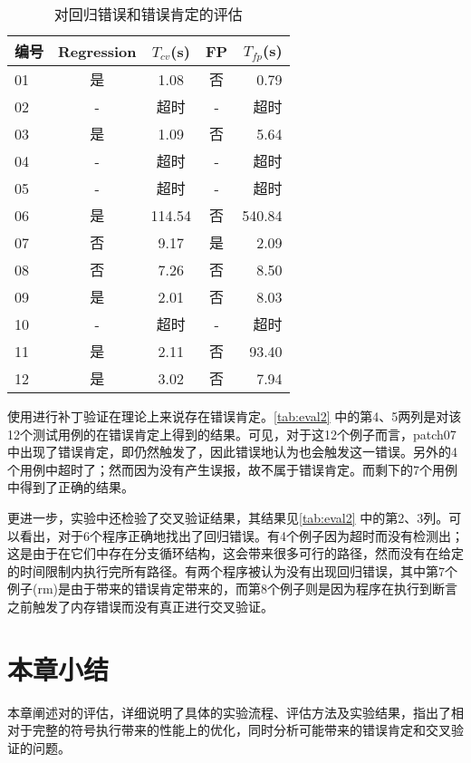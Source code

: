 \begin{table}
  \centering
  \small
  \begin{tabular}{|l|c|c|c|r|}
    \hline
    编号 & \footnotesize{Regression} & $T_{cv}$(s) & \footnotesize{FP} &$T_{fp}$(s) \\
    \hline
    01 & 是 & 1.08 & 否 & 0.79 \\ \hline
    02 & - & 超时 & - &超时\\ \hline
    03 & 是 & 1.09 & 否 &5.64\\ \hline
    04 & - & 超时 & - &超时\\ \hline
    05 & - & 超时 & - &超时\\ \hline
    06 & 是 & 114.54 & 否 & 540.84\\ \hline
    07 & 否 & 9.17 & 是 & 2.09\\ \hline
    08 & 否 & 7.26 & 否 & 8.50\\ \hline
    09 & 是 & 2.01 & 否 & 8.03\\ \hline
    10 & - & 超时 & - &超时\\ \hline
    11 & 是 & 2.11 & 否 & 93.40\\ \hline
    12 & 是 & 3.02 & 否 & 7.94\\ \hline
  \end{tabular}
  \caption{对回归错误和错误肯定的评估}
  \label{tab:eval2}
\end{table}


使用\dryrun 进行补丁验证在理论上来说存在错误肯定。\autoref{tab:eval2} 中的第4、5两列是对该12个测试用例的在错误肯定上得到的结果。可见，对于这12个例子而言，patch07中出现了错误肯定，即\dryrun 仍然触发了\bug\ass ，因此错误地认为\bug 也会触发这一错误。另外的4个用例中超时了；然而因为没有产生误报，故不属于错误肯定。而剩下的7个用例中得到了正确的结果。

更进一步，实验中还检验了交叉验证结果，其结果见\autoref{tab:eval2} 中的第2、3列。可以看出，对于6个程序\dryrun 正确地找出了回归错误。有4个例子因为超时而没有检测出；这是由于在它们\bug\scope 中存在分支循环结构，这会带来很多可行的路径，然而\dryrun 没有在给定的时间限制内执行完所有路径。有两个程序被认为没有出现回归错误，其中第7个例子(rm)是由于\bug\scope 带来的错误肯定带来的，而第8个例子则是因为程序在执行到断言之前触发了内存错误而没有真正进行交叉验证。

\section{本章小结}
\label{sec:c5}
本章阐述对\dryrun 的评估，详细说明了具体的实验流程、评估方法及实验结果，指出了相对于完整的符号执行\dryrun 带来的性能上的优化，同时分析可能带来的错误肯定和交叉验证的问题。
